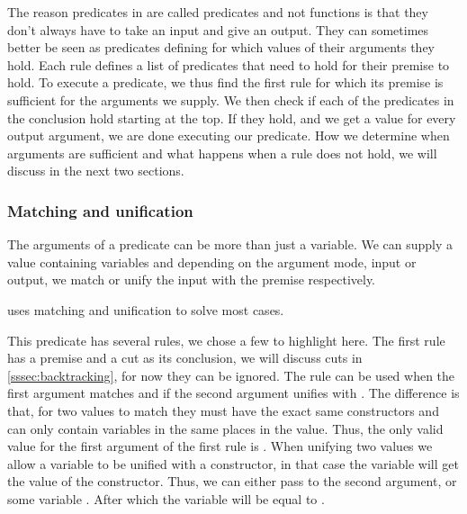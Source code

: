 \documentclass[thesis.tex]{subfiles}
\begin{document}
{{{The reason predicates in \elpi are called predicates and not functions is that they don't always have to take an input and give an output. They can sometimes better be seen as predicates defining for which values of their arguments they hold. Each rule defines a list of predicates that need to hold for their premise to hold. To execute a predicate, we thus find the first rule for which its premise is sufficient for the arguments we supply. We then check if each of the predicates in the conclusion hold starting at the top. If they hold, and we get a value for every output argument, we are done executing our predicate. How we determine when arguments are sufficient and what happens when a rule does not hold, we will discuss in the next two sections.

\subsubsection{Matching and unification}
The arguments of a predicate can be more than just a variable. We can supply a value containing variables and depending on the argument mode, input or output, we match or unify the input with the premise respectively.

 uses matching and unification to solve most cases.
This predicate has several rules, we chose a few to highlight here. The first rule has a premise and a cut as its conclusion, we will discuss cuts in \cref*{sssec:backtracking}, for now they can be ignored. The rule can be used when the first argument matches \elpiinline{[]} and if the second argument unifies with \elpiinline{[]}. The difference is that, for two values to match they must have the exact same constructors and can only contain variables in the same places in the value. Thus, the only valid value for the first argument of the first rule is \elpiinline{[]}. When unifying two values we allow a variable to be unified with a constructor, in that case the variable will get the value of the constructor. Thus, we can either pass \elpiinline{[]} to the second argument, or some variable . After which the variable  will be equal to \elpiinline{[]}.

}}}
\end{document}
